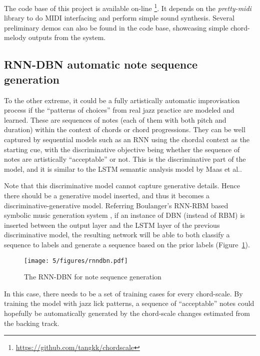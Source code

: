 The code base of this project is available on-line \footnote{\url{https://github.com/tangkk/chordscale}}. It depends on the \textit{pretty-midi} \cite{raffel2014intuitive} library to do MIDI interfacing and perform simple sound synthesis. Several preliminary demos can also be found in the code base, showcasing simple chord-melody outputs from the system.

\subsection{RNN-DBN automatic note sequence generation}
To the other extreme, it could be a fully artistically automatic improvisation process if the ``patterns of choices'' from real jazz practice \cite{jazzguitarimpro,pracjazz} are modeled and learned. These are sequences of notes (each of them with both pitch and duration) within the context of chords or chord progressions. They can be well captured by sequential models such as an RNN using the chordal context as the starting cue, with the discriminative objective being whether the sequence of notes are artistically ``acceptable'' or not. This is the discriminative part of the model, and it is similar to the LSTM semantic analysis model by Maas et al.\cite{maas2011learning}.

Note that this discriminative model cannot capture generative details. Hence there should be a generative model inserted, and thus it becomes a discriminative-generative model. Referring Boulanger's RNN-RBM based symbolic music generation system \cite{boulanger2012modeling}, if an instance of DBN (instead of RBM) is inserted between the output layer and the LSTM layer of the previous discriminative model, the resulting network will be able to both classify a sequence to labels and generate a sequence based on the prior labels (Figure~\ref{fig:5-rnndbn}).

\begin{figure}[htb]
    \centering
        \texttt{[image: 5/figures/rnndbn.pdf]}
    \caption{The RNN-DBN for note sequence generation}
    \label{fig:5-rnndbn}
\end{figure}

In this case, there needs to be a set of training cases for every chord-scale. By training the model with jazz lick patterns, a sequence of ``acceptable'' notes could hopefully be automatically generated by the chord-scale changes estimated from the backing track.





 






